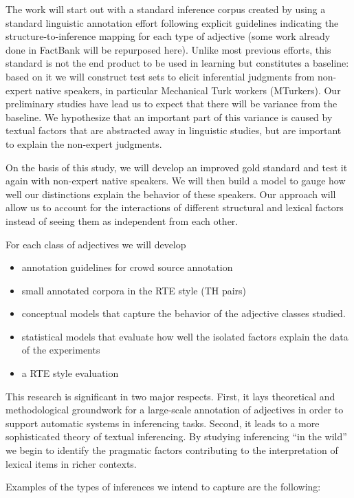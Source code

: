\documentclass[10pt]{article}
\newcommand{\moveup}{\vspace*{-1.8mm}}
\begin{document}
The work will start out with a standard inference corpus created by using a standard linguistic annotation effort following explicit guidelines indicating the structure-to-inference mapping for each type of adjective (some work already done in FactBank will be repurposed here). Unlike most previous efforts, this standard is not the end product to be used in learning but constitutes a baseline: based on it we will construct test sets to elicit inferential judgments from non-expert native speakers, in particular Mechanical Turk workers (MTurkers). Our preliminary studies have lead us to expect that there will be variance from the baseline. We hypothesize that an important part of this variance is caused by textual factors that are abstracted away in linguistic studies, but are important to explain the non-expert judgments. 

On the basis of this study, we will develop an improved gold standard and test it again with non-expert native speakers. We will then build a model to gauge how well our distinctions explain the behavior of these speakers. Our approach will allow us to account for the interactions of different structural and lexical factors instead of seeing them as independent from each other. 

For each class of adjectives we will develop
\begin{itemize}
\moveup
\item annotation guidelines for crowd source annotation
\moveup
\item small annotated corpora in the RTE style (TH pairs)
\moveup
\item conceptual models that capture the behavior of the adjective classes studied.
\moveup
\item statistical models that evaluate how well the isolated factors explain the data of the experiments
\moveup
\item a RTE style evaluation 
\moveup
\end{itemize} 

This research is significant in two major respects.  First, it lays theoretical and methodological groundwork for a large-scale annotation of adjectives in order to support automatic systems in inferencing tasks. Second, it leads to a more sophisticated theory of textual inferencing. By studying inferencing ``in the wild'' we begin to identify the pragmatic factors contributing to the interpretation of lexical items in richer contexts.

Examples of the types of inferences we intend to capture are the following:
\end{document}
